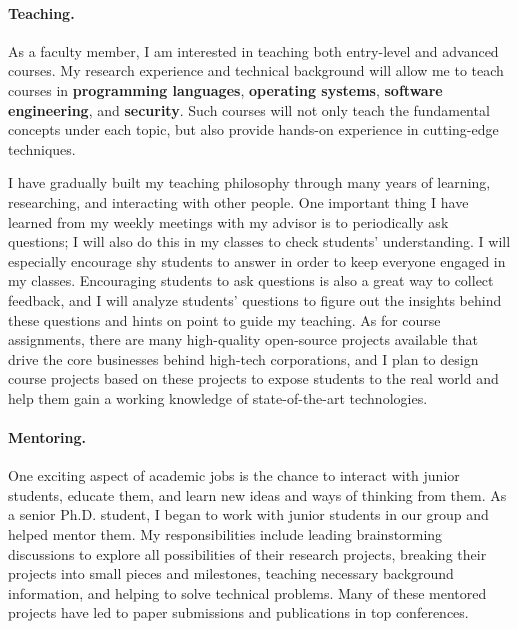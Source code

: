 \documentclass[10pt]{article}
\begin{document}
\vspace{-0.1in}
\paragraph*{Teaching.}
As a faculty member, I am interested in teaching both entry-level and advanced courses. My research experience and technical background will allow me to teach courses in {\bf programming languages}, {\bf operating systems}, {\bf software engineering}, and {\bf security}. Such courses will not only teach the fundamental concepts under each topic, but also provide hands-on experience in cutting-edge techniques.

I have gradually built my teaching philosophy through many years of learning, researching, and interacting with other people. 
One important thing I have learned from my weekly meetings with my advisor is to periodically ask questions; I will also do this in my classes to check students' understanding. 
I will especially encourage shy students to answer in order to keep everyone engaged in my classes. 
Encouraging students to ask questions is also a great way to collect feedback, and I will analyze students' questions to figure out the insights behind these questions and
hints on point to guide my teaching. 
As for course assignments, there are many high-quality open-source projects
available that drive the core businesses behind high-tech corporations, and I plan to design course projects 
based on these projects to expose students to the real world and help them gain a working knowledge of state-of-the-art technologies.


\vspace{-0.1in}
\paragraph*{Mentoring.}
One exciting aspect of academic jobs is the chance to interact with junior students, educate them, and learn new ideas and ways of thinking from them. 
As a senior Ph.D. student, I began to work with junior students in
our group and helped mentor them. 
My responsibilities include leading brainstorming discussions to explore all
possibilities of their research projects, breaking their projects into small pieces and milestones, 
teaching necessary background information, and helping to solve technical problems. 
Many of these mentored projects have
led to paper submissions and publications in top conferences.
\end{document}
